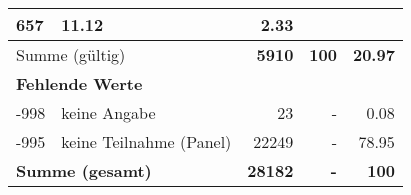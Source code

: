 \begin{longtable}{lXrrr}
       \num{657} &
       \num[round-mode=places,round-precision=2]{11,12} &
         \num[round-mode=places,round-precision=2]{2,33} \\
     \midrule
     \multicolumn{2}{l}{Summe (gültig)} &
       \textbf{\num{5910}} &
     \textbf{100} &
       \textbf{\num[round-mode=places,round-precision=2]{20,97}} \\
     \multicolumn{5}{l}{\textbf{Fehlende Werte}}\\
       -998 &
       keine Angabe &
         \num{23} &
        - &
         \num[round-mode=places,round-precision=2]{0,08} \\
       -995 &
       keine Teilnahme (Panel) &
         \num{22249} &
        - &
         \num[round-mode=places,round-precision=2]{78,95} \\
     \midrule
     \multicolumn{2}{l}{\textbf{Summe (gesamt)}} &
          \textbf{\num{28182}} &
        \textbf{-} &
        \textbf{100} \\
     \bottomrule
     \end{longtable}
     
